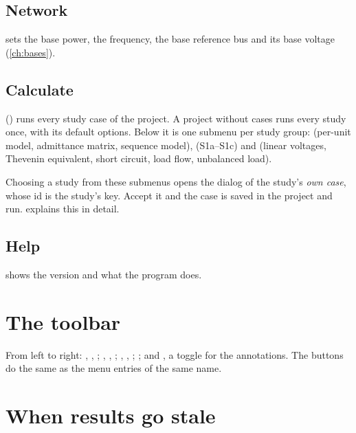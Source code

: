 \subsection{Network}

 sets the base power, the frequency, the base reference bus and its
base voltage (\cref{ch:bases}).

\subsection{Calculate}

\begin{minipage}[t]{0.62\linewidth}
 () runs every study case of the project. A project without
cases runs every study once, with its default options. Below it is one submenu per study
group:  (per-unit model, admittance matrix, sequence model),  (S1a--S1c) and  (linear voltages, Thevenin equivalent, short circuit, load
flow, unbalanced load).

Choosing a study from these submenus opens the dialog of the study's \emph{own case},
whose id is the study's key. Accept it and the case is saved in the project and run.
 explains this in detail.
\end{minipage}\hfill
\begin{minipage}[t]{0.33\linewidth}\vspace{0pt}
  \centering{}
\end{minipage}

\subsection{Help}

 shows the version and what the program does.

\section{The toolbar}\label{sec:toolbar}

From left to right: , , ; , ,
; , , ; ;
and , a toggle for the annotations. The buttons do the
same as the menu entries of the same name.

\section{When results go stale}


